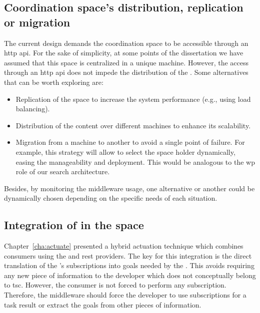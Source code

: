 \subsection{Coordination space's distribution, replication or migration} %

The current design demands the coordination space to be accessible through an \ac{http} \ac{api}.
For the sake of simplicity, at some points of the dissertation we have assumed that this space is centralized in a unique machine.
However, the access through an \ac{http} \ac{api} does not impede the distribution of the \coordspace{}.
Some alternatives that can be worth exploring are: %
\begin{itemize}
  \item Replication of the space to increase the system performance (e.g., using load balancing).
  \item Distribution of the content over different machines to enhance its scalability. %
  \item Migration from a machine to another to avoid a single point of failure.
        For example, this strategy will allow to select the space holder dynamically, easing the \coordspace{} manageability and deployment.
        This would be analogous to the \ac{wp} role of our search architecture. %
\end{itemize}

Besides, by monitoring the middleware usage, one alternative or another could be dynamically chosen depending on the specific needs of each situation.


\subsection{Integration of \restActuation{} in the space}

Chapter~\ref{cha:actuate} presented a hybrid actuation technique which combines consumers using the \spaceActuation{} and \ac{rest} providers.
The key for this integration is the direct translation of the \coordspace{}'s subscriptions into goals needed by the \restActuation{}.
This avoids requiring any new piece of information to the developer which does not conceptually belong to \ac{tsc}.
However, the consumer is not forced to perform any subscription.
Therefore, the middleware should force the developer to use subscriptions for a task result or extract the goals from other pieces of information.


